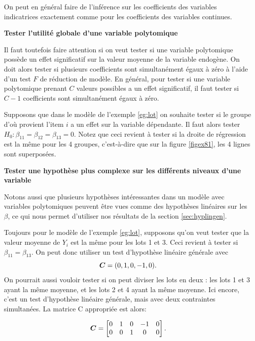 On peut en général faire de l'inférence sur les coefficients des variables indicatrices exactement comme pour les coefficients des variables continues.

\textbf{Tester l'utilité globale d'une variable polytomique}

Il faut toutefois faire attention si on veut tester si une variable polytomique possède un effet significatif
sur la valeur moyenne de la variable endogène. On doit alors tester si
plusieurs coefficients sont simultanément égaux à zéro à
l'aide d'un test $F$ de réduction de modèle. En général, pour tester si une variable polytomique prenant
$C$ valeurs possibles a un effet significatif, il faut tester si
$C-1$ coefficients sont simultanément égaux à zéro.

\begin{exemple}
Supposons que dans le modèle de l'exemple \ref{eg:lot} on souhaite tester si le groupe
d'o\`u provient l'item $i$ a un effet sur la variable dépendante. Il faut alors tester $H_0:\beta_{11}=\beta_{12}=\beta_{13}=0$. Notez que ceci revient à tester si la droite de régression est la m\^eme pour les 4 groupes, c'est-à-dire que sur la figure
\ref{figex81}, les 4 lignes sont superposées.
\end{exemple}

\textbf{Tester une hypothèse plus complexe sur les différents niveaux d'une variable}


Notons aussi que plusieurs hypothèses intéressantes dans un modèle avec variables polytomiques peuvent \^etre vues comme des hypothèses linéaires sur les $\beta$, ce qui nous permet d'utiliser nos résultats de la section \ref{sec:hyplingen}.

\begin{exemple}
Toujours pour le modèle de l'exemple \ref{eg:lot}, supposons qu'on veut tester que la valeur moyenne de $Y_i$ est la m\^eme pour les lots 1 et 3. Ceci revient à tester si $\beta_{11} = \beta_{13}$. On peut donc utiliser un test d'hypothèse linéaire générale avec $$\mbox{\boldmath$C$\unboldmath} = (0,1,0,-1,0).$$
On pourrait aussi vouloir tester si on peut diviser les lots en deux : les lots 1 et 3 ayant la même moyenne, et les lots 2 et 4 ayant la même moyenne. Ici encore, c'est un test d'hypothèse linéaire générale, mais avec deux contraintes simultanées. La matrice C appropriée est alors:

$$ \mbox{\boldmath$C$\unboldmath}  =
\begin{bmatrix}
    0 & 1 & 0 & -1 & 0 \\
    0 & 0 & 1 & 0 & 0
\end{bmatrix}.
$$
\end{exemple}




